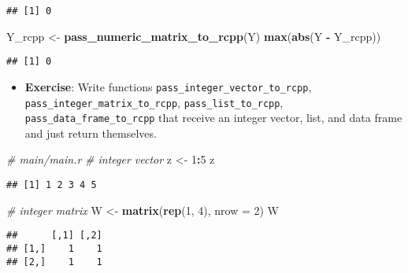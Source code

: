 \documentclass[
]{book}
\newenvironment{Shaded}{\begin{snugshade}}{\end{snugshade}}
\newcommand{\AttributeTok}[1]{\textcolor[rgb]{0.13,0.29,0.53}{#1}}
\newcommand{\CommentTok}[1]{\textcolor[rgb]{0.56,0.35,0.01}{\textit{#1}}}
\newcommand{\DecValTok}[1]{\textcolor[rgb]{0.00,0.00,0.81}{#1}}
\newcommand{\FunctionTok}[1]{\textcolor[rgb]{0.13,0.29,0.53}{\textbf{#1}}}
\newcommand{\NormalTok}[1]{#1}
\newcommand{\OtherTok}[1]{\textcolor[rgb]{0.56,0.35,0.01}{#1}}
\newcommand{\SpecialCharTok}[1]{\textcolor[rgb]{0.81,0.36,0.00}{\textbf{#1}}}
\providecommand{\tightlist}{%
  \setlength{\itemsep}{0pt}\setlength{\parskip}{0pt}}
\begin{document}
\begin{verbatim}
## [1] 0
\end{verbatim}

\begin{Shaded}
\begin{Highlighting}[]
\NormalTok{Y\_rcpp }\OtherTok{\textless{}{-}} \FunctionTok{pass\_numeric\_matrix\_to\_rcpp}\NormalTok{(Y)}
\FunctionTok{max}\NormalTok{(}\FunctionTok{abs}\NormalTok{(Y }\SpecialCharTok{{-}}\NormalTok{ Y\_rcpp))}
\end{Highlighting}
\end{Shaded}

\begin{verbatim}
## [1] 0
\end{verbatim}

\begin{itemize}
\tightlist
\item
  \textbf{Exercise}: Write functions \texttt{pass\_integer\_vector\_to\_rcpp}, \texttt{pass\_integer\_matrix\_to\_rcpp}, \texttt{pass\_list\_to\_rcpp}, \texttt{pass\_data\_frame\_to\_rcpp} that receive an integer vector, list, and data frame and just return themselves.
\end{itemize}

\begin{Shaded}
\begin{Highlighting}[]
\CommentTok{\# main/main.r}
\CommentTok{\# integer vector}
\NormalTok{z }\OtherTok{\textless{}{-}} \DecValTok{1}\SpecialCharTok{:}\DecValTok{5}
\NormalTok{z}
\end{Highlighting}
\end{Shaded}

\begin{verbatim}
## [1] 1 2 3 4 5
\end{verbatim}

\begin{Shaded}
\begin{Highlighting}[]
\CommentTok{\# integer matrix}
\NormalTok{W }\OtherTok{\textless{}{-}} \FunctionTok{matrix}\NormalTok{(}\FunctionTok{rep}\NormalTok{(}\DecValTok{1}\NormalTok{, }\DecValTok{4}\NormalTok{), }\AttributeTok{nrow =} \DecValTok{2}\NormalTok{)}
\NormalTok{W}
\end{Highlighting}
\end{Shaded}

\begin{verbatim}
##      [,1] [,2]
## [1,]    1    1
## [2,]    1    1
\end{verbatim}
\end{document}

